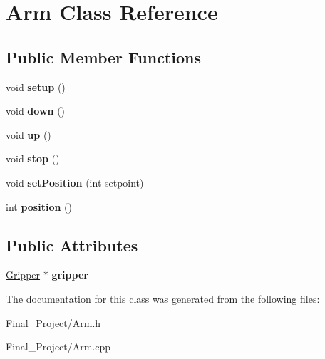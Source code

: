 \hypertarget{classArm}{\section{Arm Class Reference}
\label{classArm}
}
\subsection*{Public Member Functions}
\begin{DoxyCompactItemize}
\item 
\hypertarget{classArm_a0e642e1a6fc24f40268f2c759dee62e1}{void {\bfseries setup} ()}\label{classArm_a0e642e1a6fc24f40268f2c759dee62e1}

\item 
\hypertarget{classArm_a9075166ca53ef3cd547a7725ee5bca1d}{void {\bfseries down} ()}\label{classArm_a9075166ca53ef3cd547a7725ee5bca1d}

\item 
\hypertarget{classArm_a65ffd463407a6782a55dbd5b84f1e15e}{void {\bfseries up} ()}\label{classArm_a65ffd463407a6782a55dbd5b84f1e15e}

\item 
\hypertarget{classArm_a4a8274680d981524efbeb2b51eb49c28}{void {\bfseries stop} ()}\label{classArm_a4a8274680d981524efbeb2b51eb49c28}

\item 
\hypertarget{classArm_a720cd8598fb21b6382f48acd9d3583eb}{void {\bfseries set\-Position} (int setpoint)}\label{classArm_a720cd8598fb21b6382f48acd9d3583eb}

\item 
\hypertarget{classArm_ab49756ee4bfdc5f573a78f29678bf1d8}{int {\bfseries position} ()}\label{classArm_ab49756ee4bfdc5f573a78f29678bf1d8}

\end{DoxyCompactItemize}
\subsection*{Public Attributes}
\begin{DoxyCompactItemize}
\item 
\hypertarget{classArm_a5d8c0e5790de4c4cf4399314afbbf03a}{\hyperlink{classGripper}{Gripper} $\ast$ {\bfseries gripper}}\label{classArm_a5d8c0e5790de4c4cf4399314afbbf03a}

\end{DoxyCompactItemize}


The documentation for this class was generated from the following files\-:\begin{DoxyCompactItemize}
\item 
Final\-\_\-\-Project/Arm.\-h\item 
Final\-\_\-\-Project/Arm.\-cpp\end{DoxyCompactItemize}
